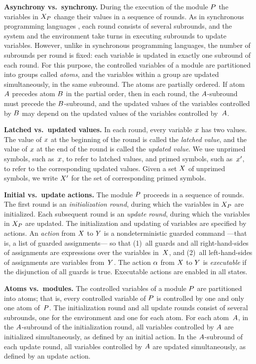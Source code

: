 \mypar
{\bf Asynchrony vs.\ synchrony.}
During the execution of the module ${P}$ the variables in $X_{{P}}$
change their values in a sequence of rounds.
As in synchronous programming languages
\cite{BerryGonthier88,BRS93,Halbwachs93:book}, each round consists of several
subrounds, and the system and the environment take turns in executing
subrounds to update variables.
However, unlike in synchronous programming languages, the number of subrounds
per round is fixed:
each variable is updated in exactly one subround of each round.
For this purpose, the controlled variables of a module are partitioned into
groups called {\em atoms}, and the variables within a group are updated
simultaneously, in the same subround.
The atoms are partially ordered.
If atom $A$ precedes atom $B$ in the partial order, then in each
round, the $A$-subround must precede the $B$-subround, and the
updated values of the variables controlled by $B$ may depend on the
updated values of the variables controlled by~$A$.

\mypar
{\bf Latched vs.\ updated values.}
In each round, every variable $x$ has two values.
The value of $x$ at the beginning of the round is called the
{\em latched value}, and the value of $x$ at the end of the round is
called the {\em updated value}.
We use unprimed symbols, such as~$x$, to refer to latched values, and
primed symbols, such as~$x'$, to refer to the corresponding updated
values.
Given a set $X$ of unprimed symbols, we write $X'$ for the set of
corresponding primed symbols.

\mypar
{\bf Initial vs.\ update actions.}
The module ${P}$ proceeds in a sequence of rounds.
The first round is an {\em initialization round}, during which the variables
in $X_{{P}}$ are initialized.
Each subsequent round is an {\em update round}, during which the variables in
$X_{{P}}$ are updated.
The initialization and updating of variables are specified by actions.
An {\em action\/} from $X$ to $Y$ is a nondeterministic guarded
command ---that is, a list of guarded assignments--- so that
(1)~all guards and all right-hand-sides of assignments are expressions over
  the variables in~$X$, and
(2)~all left-hand-sides of assignments are variables from~$Y$.
The action $\alpha$ from $X$ to $Y$ is {\em executable\/} if the
disjunction of all guards is true.
Executable actions are enabled in all states.

\mypar
{\bf Atoms vs.\ modules.}
The controlled variables of a module ${P}$ are partitioned into atoms;
that is, every controlled variable of ${P}$ is controlled by one and only one
atom of~${P}$.
The initialization round and all update rounds consist of several subrounds,
one for the environment and one for each atom.
For each atom~$A$, in the $A$-subround of the initialization round,
all variables controlled by $A$ are initialized simultaneously, as
defined by an initial action.
In the $A$-subround of each update round, all variables controlled by
$A$ are updated simultaneously, as defined by an update action.

